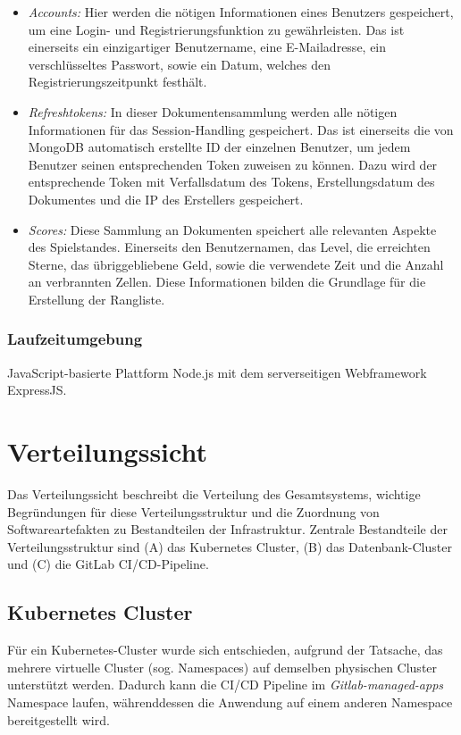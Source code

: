 \documentclass[letterpaper, 10 pt, conference]{ieeeconf}
\begin{document}
\begin{itemize}
\item
\textit{Accounts:} Hier werden die nötigen Informationen eines Benutzers gespeichert, um
eine Login- und Registrierungsfunktion zu gewährleisten. Das ist einerseits ein
einzigartiger Benutzername, eine E-Mailadresse, ein verschlüsseltes Passwort, sowie
ein Datum, welches den Registrierungszeitpunkt festhält.
\item
\textit{Refreshtokens:} In dieser Dokumentensammlung werden alle nötigen Informationen für
das Session-Handling gespeichert. Das ist einerseits die von MongoDB automatisch
erstellte ID der einzelnen Benutzer, um jedem Benutzer seinen entsprechenden Token
zuweisen zu können. Dazu wird der entsprechende Token mit Verfallsdatum
des Tokens,  Erstellungsdatum des Dokumentes und die IP des Erstellers gespeichert.
\item
\textit{Scores:} Diese Sammlung an Dokumenten speichert alle relevanten Aspekte des
Spielstandes. Einerseits den Benutzernamen, das Level, die erreichten Sterne, das
übriggebliebene Geld, sowie die verwendete Zeit und die Anzahl an verbrannten Zellen.
Diese Informationen bilden die Grundlage für die Erstellung der Rangliste.
\end{itemize}

\subsubsection{Laufzeitumgebung}

JavaScript-basierte Plattform Node.js mit dem serverseitigen Webframework ExpressJS.

\section{Verteilungssicht}
Das Verteilungssicht beschreibt die Verteilung des Gesamtsystems,  wichtige Begründungen für diese Verteilungsstruktur und die Zuordnung von Softwareartefakten zu Bestandteilen der Infrastruktur.
Zentrale Bestandteile der Verteilungsstruktur sind (A) das Kubernetes Cluster,  (B) das Datenbank-Cluster und (C) die GitLab CI/CD-Pipeline.

\subsection{Kubernetes Cluster}

Für ein Kubernetes-Cluster wurde sich entschieden, aufgrund der Tatsache, das mehrere virtuelle Cluster (sog. Namespaces) auf demselben physischen Cluster unterstützt werden. Dadurch kann die CI/CD Pipeline im \textit{Gitlab-managed-apps} Namespace laufen, währenddessen die Anwendung auf einem anderen Namespace bereitgestellt wird.
\end{document}
